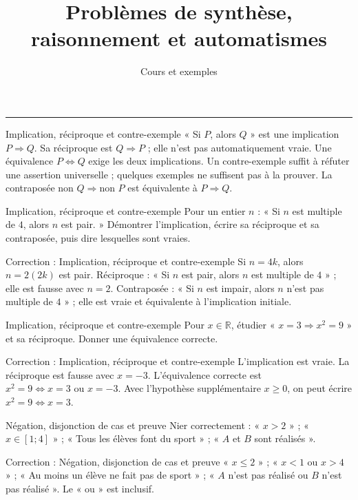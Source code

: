 \documentclass[aspectratio=169,10pt]{beamer}
\title{Problèmes de synthèse, raisonnement et automatismes}
\subtitle{Cours et exemples}
\date{}
\author{}
\providecommand{\R}{\mathbb{R}}
\begin{document}
\begin{frame}[plain]
\vfill
{\inserttitle\par}
\medskip
{\insertsubtitle\par}
\medskip
{\rule{\textwidth}{.5pt}}
\vfill
\end{frame}
\begin{frame}{Implication, réciproque et contre-exemple}
« Si \(P\), alors \(Q\) » est une implication \(P\Rightarrow Q\). Sa réciproque est \(Q\Rightarrow P\) ; elle n'est pas automatiquement vraie. Une équivalence \(P\iff Q\) exige les deux implications.
Un contre-exemple suffit à réfuter une assertion universelle ; quelques exemples ne suffisent pas à la prouver. La contraposée \(\text{non }Q\Rightarrow\text{non }P\) est équivalente à \(P\Rightarrow Q\).
\end{frame}
\begin{frame}{Implication, réciproque et contre-exemple}
Pour un entier \(n\) : « Si \(n\) est multiple de \(4\), alors \(n\) est pair. » Démontrer l'implication, écrire sa réciproque et sa contraposée, puis dire lesquelles sont vraies.
\end{frame}
\begin{frame}{Correction : Implication, réciproque et contre-exemple}
Si \(n=4k\), alors \(n=2(2k)\) est pair. Réciproque : « Si \(n\) est pair, alors \(n\) est multiple de \(4\) » ; elle est fausse avec \(n=2\). Contraposée : « Si \(n\) est impair, alors \(n\) n'est pas multiple de \(4\) » ; elle est vraie et équivalente à l'implication initiale.
\end{frame}
\begin{frame}{Implication, réciproque et contre-exemple}
Pour \(x\in\R\), étudier « \(x=3\Rightarrow x^2=9\) » et sa réciproque. Donner une équivalence correcte.
\end{frame}
\begin{frame}{Correction : Implication, réciproque et contre-exemple}
L'implication est vraie. La réciproque est fausse avec \(x=-3\). L'équivalence correcte est \(x^2=9\iff x=3\text{ ou }x=-3\). Avec l'hypothèse supplémentaire \(x\geq0\), on peut écrire \(x^2=9\iff x=3\).
\end{frame}
\begin{frame}{Négation, disjonction de cas et preuve}
Nier correctement : « \(x>2\) » ; « \(x\in[1;4]\) » ; « Tous les élèves font du sport » ; « \(A\) et \(B\) sont réalisés ».
\end{frame}
\begin{frame}{Correction : Négation, disjonction de cas et preuve}
« \(x\leq2\) » ; « \(x<1\) ou \(x>4\) » ; « Au moins un élève ne fait pas de sport » ; « \(A\) n'est pas réalisé ou \(B\) n'est pas réalisé ». Le « ou » est inclusif.
\end{frame}
\end{document}
